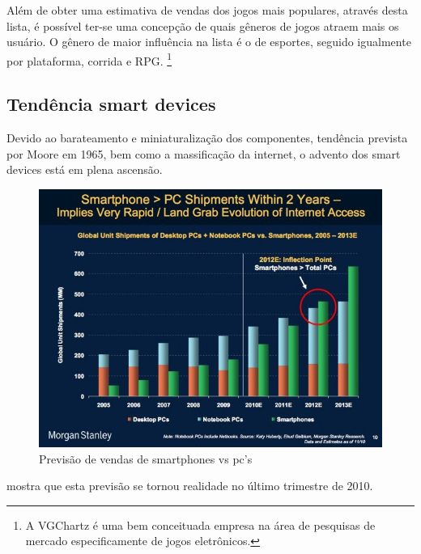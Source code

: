 \documentclass{article}
\begin{document}
Além de obter uma estimativa de vendas dos jogos mais populares, através desta lista, é possível ter-se uma concepção de quais gêneros de jogos atraem mais os usuário. O gênero de maior influência na lista é o de esportes, seguido igualmente por plataforma, corrida e RPG.
\footnote{A VGChartz é uma bem conceituada   empresa na área de pesquisas de mercado especificamente de jogos eletrônicos.}

\subsection{Tendência smart devices}

Devido ao barateamento e miniaturalização dos componentes, tendência prevista por Moore em 1965, bem como a massificação da internet, o advento dos smart devices está em plena ascensão.

\newpage

\begin{figure}[!htbp]
    \begin{center}
        \includegraphics[width=\textwidth]{asset/img/smartvscomputer.jpg}
               \caption{Previsão de vendas de smartphones vs pc's}
    \end{center}
\end{figure}

\cite[2012, p.19]{WEINTRAUB} mostra que esta previsão se tornou realidade no último trimestre de 2010.
\end{document}

